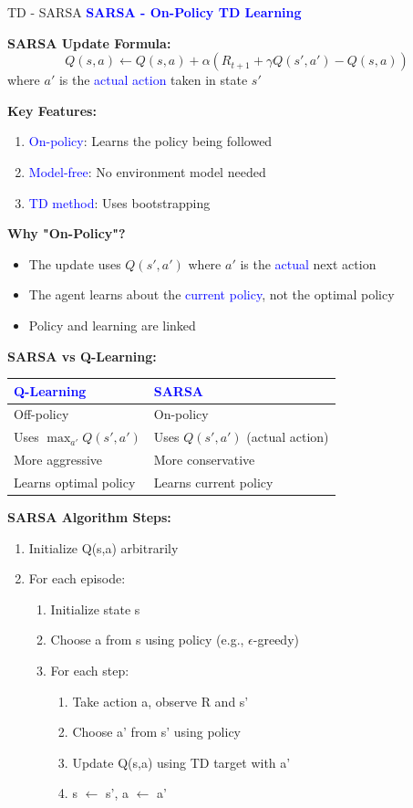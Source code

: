 \documentclass[8pt]{beamer}
\begin{document}
	\begin{frame}{TD - SARSA}
		\fontsize{6.5}{7.5}\selectfont
		\textcolor{blue}{\textbf{SARSA - On-Policy TD Learning}}
		
		\textbf{SARSA Update Formula:}
		\[
		Q(s,a) \leftarrow Q(s,a) + \alpha(R_{t+1} + \gamma Q(s',a') - Q(s,a))
		\]
		where $a'$ is the \textcolor{blue}{actual action} taken in state $s'$
		
		\textbf{Key Features:}
		\begin{enumerate}
			\item \textcolor{blue}{On-policy}: Learns the policy being followed
			\item \textcolor{blue}{Model-free}: No environment model needed
			\item \textcolor{blue}{TD method}: Uses bootstrapping
		\end{enumerate}
		
		\textbf{Why "On-Policy"?}
		\begin{itemize}
			\item The update uses $Q(s',a')$ where $a'$ is the \textcolor{blue}{actual} next action
			\item The agent learns about the \textcolor{blue}{current policy}, not the optimal policy
			\item Policy and learning are linked
		\end{itemize}
		
		\textbf{SARSA vs Q-Learning:}
		\begin{tabular}{|p{4cm}|p{4cm}|}
			\hline
			\textcolor{blue}{Q-Learning} & \textcolor{blue}{SARSA} \\
			\hline
			Off-policy & On-policy \\
			\hline
			Uses $\max_{a'} Q(s',a')$ & Uses $Q(s',a')$ (actual action) \\
			\hline
			More aggressive & More conservative \\
			\hline
			Learns optimal policy & Learns current policy \\
			\hline
		\end{tabular}
		
		\textbf{SARSA Algorithm Steps:}
		\begin{enumerate}
			\item Initialize Q(s,a) arbitrarily
			\item For each episode:
			\begin{enumerate}
				\item Initialize state s
				\item Choose a from s using policy (e.g., $\epsilon$-greedy)
				\item For each step:
				\begin{enumerate}
					\item Take action a, observe R and s'
					\item Choose a' from s' using policy
					\item Update Q(s,a) using TD target with a'
					\item s $\leftarrow$ s', a $\leftarrow$ a'
				\end{enumerate}
			\end{enumerate}
		\end{enumerate}
		

\end{frame}
\end{document}
